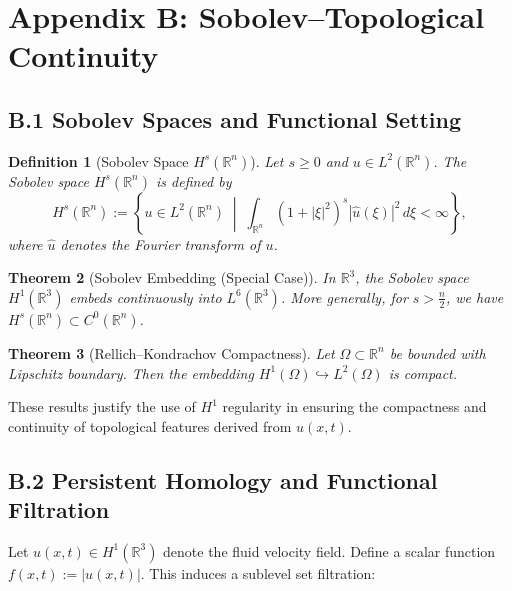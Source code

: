 \documentclass[11pt]{article}
\newtheorem{theorem}{Theorem}[section]
\newtheorem{definition}[theorem]{Definition}
\begin{document}

\section*{Appendix B: Sobolev–Topological Continuity}



\subsection*{B.1 Sobolev Spaces and Functional Setting}

\begin{definition}[Sobolev Space $H^s(\mathbb{R}^n)$]
Let $s \geq 0$ and $u \in L^2(\mathbb{R}^n)$. The Sobolev space $H^s(\mathbb{R}^n)$ is defined by
\[
H^s(\mathbb{R}^n) := \left\{ u \in L^2(\mathbb{R}^n) \;\middle|\; \int_{\mathbb{R}^n} (1 + |\xi|^2)^s |\widehat{u}(\xi)|^2 \, d\xi < \infty \right\},
\]
where $\widehat{u}$ denotes the Fourier transform of $u$.
\end{definition}

\begin{theorem}[Sobolev Embedding (Special Case)]
In $\mathbb{R}^3$, the Sobolev space $H^1(\mathbb{R}^3)$ embeds continuously into $L^6(\mathbb{R}^3)$.  
More generally, for $s > \frac{n}{2}$, we have $H^s(\mathbb{R}^n) \subset C^0(\mathbb{R}^n)$.
\end{theorem}

\begin{theorem}[Rellich–Kondrachov Compactness]
Let $\Omega \subset \mathbb{R}^n$ be bounded with Lipschitz boundary. Then the embedding $H^1(\Omega) \hookrightarrow L^2(\Omega)$ is compact.
\end{theorem}

These results justify the use of $H^1$ regularity in ensuring the compactness and continuity of topological features derived from $u(x,t)$.



\subsection*{B.2 Persistent Homology and Functional Filtration}

Let $u(x,t) \in H^1(\mathbb{R}^3)$ denote the fluid velocity field. Define a scalar function $f(x,t) := |u(x,t)|$. This induces a sublevel set filtration:
\end{document}
